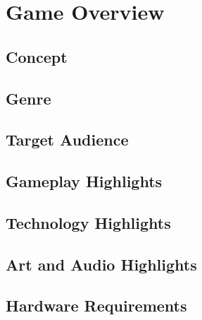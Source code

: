 \chapter{Game Overview}\label{ch:overview}

\section{Concept}
\section{Genre}
\section{Target Audience}
\section{Gameplay Highlights}
\section{Technology Highlights}
\section{Art and Audio Highlights}
\section{Hardware Requirements}

